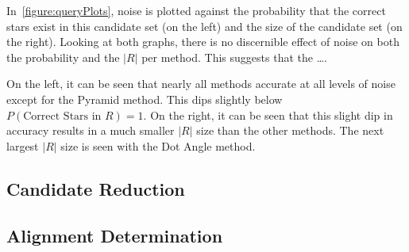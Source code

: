 \begin{figure}
\end{figure}

In~\autoref{figure:queryPlots}, noise is plotted against the probability that the correct stars exist in this
candidate set (on the left) and the size of the candidate set (on the right).
Looking at both graphs, there is no discernible effect of noise on both the probability and the $\lvert R \rvert$ per
method.
This suggests that the \ldots.

On the left, it can be seen that nearly all methods accurate at all levels of noise except for the Pyramid method.
This dips slightly below $P(\text{Correct Stars in } R) = 1$.
On the right, it can be seen that this slight dip in accuracy results in a much smaller $\lvert R \rvert$ size than
the other methods.
The next largest $\lvert R \rvert$ size is seen with the Dot Angle method.

\subsection{Candidate Reduction}\label{subsec:candidateReductionResults}


\subsection{Alignment Determination}\label{subsec:alignmentDeterminationResults}


